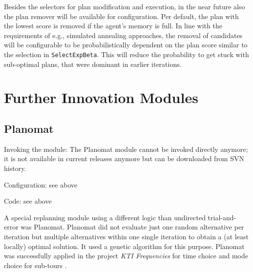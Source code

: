 Besides the selectors for plan modification and execution, in the near future also the plan remover will be available for configuration. Per default, the plan with the lowest score is removed if the agent's memory is full. In line with the requirements of e.g., simulated annealing approaches, the removal of candidates will be configurable to be probabilistically dependent on the plan score similar to the selection in \lstinline|SelectExpBeta|. This will reduce the probability to get stuck with sub-optimal plans, that were dominant in earlier iterations.

\section{Further Innovation Modules}
\label{sec:furtherchoicemodules}
\subsection{\color{lightgray}Planomat}
\label{sec:planomat}


{\color{lightgray}\tiny

\begin{compactitem}
\item Invoking the module: The Planomat module cannot be invoked directly anymore; it is not available in current releases anymore but can be downloaded from SVN history. 
\item Configuration: see above
\item Code: see above
\end{compactitem}

A special replanning module using a different logic than undirected trial-and-error was Planomat. Planomat did not evaluate just one random alternative per iteration but multiple alternatives within one single iteration to obtain a (at least locally) optimal solution. It used a genetic algorithm \citep[][]{MeisterEtAl_IATBR_2006, MeisterEtAl_STRC_2006, Meister_PhDThesis_2011} for this purpose. Planomat was successfully applied in the project \emph{KTI Frequencies} for time choice and mode choice for sub-tours \citep[][p.10]{BalmerEtAl_ResRep_datapuls_2010}.
}

